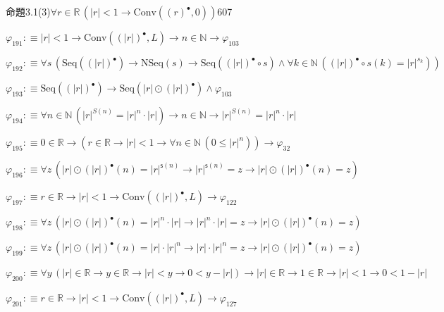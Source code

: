\begin{fullproof}{命題3.1(3)}{$\forall r \in \mathbb{R}\,(\lvert r \rvert < 1 \to \mathrm{Conv}({(r)^{\bullet}},0))$}{607}
\begin{abbrevlist}
\item $\varphi_{191} :\equiv \lvert r \rvert < 1 \to \mathrm{Conv}({(\lvert r \rvert)^{\bullet}},L) \to n \in \mathbb{N} \to \varphi_{103}$
\item $\varphi_{192} :\equiv \forall s\,(\mathrm{Seq}({(\lvert r \rvert)^{\bullet}}) \to \mathrm{NSeq}(s) \to \mathrm{Seq}({(\lvert r \rvert)^{\bullet}} \circ s) \land \forall k \in \mathbb{N}\,({(\lvert r \rvert)^{\bullet}} \circ s(k) = {{\lvert r \rvert}^{s_{k}}}))$
\item $\varphi_{193} :\equiv \mathrm{Seq}({(\lvert r \rvert)^{\bullet}}) \to \mathrm{Seq}(\lvert r \rvert \odot {(\lvert r \rvert)^{\bullet}}) \land \varphi_{103}$
\item $\varphi_{194} :\equiv \forall n \in \mathbb{N}\,({{\lvert r \rvert}^{S(n)}} = {{\lvert r \rvert}^{n}} \cdot \lvert r \rvert) \to n \in \mathbb{N} \to {{\lvert r \rvert}^{S(n)}} = {{\lvert r \rvert}^{n}} \cdot \lvert r \rvert$
\item $\varphi_{195} :\equiv 0 \in \mathbb{R} \to (r \in \mathbb{R} \to \lvert r \rvert < 1 \to \forall n \in \mathbb{N}\,(0 \leq {{\lvert r \rvert}^{n}})) \to \varphi_{32}$
\item $\varphi_{196} :\equiv \forall z\,(\lvert r \rvert \odot {(\lvert r \rvert)^{\bullet}}(n) = {{\lvert r \rvert}^{\mathsf{s}(n)}} \to {{\lvert r \rvert}^{\mathsf{s}(n)}} = z \to \lvert r \rvert \odot {(\lvert r \rvert)^{\bullet}}(n) = z)$
\item $\varphi_{197} :\equiv r \in \mathbb{R} \to \lvert r \rvert < 1 \to \mathrm{Conv}({(\lvert r \rvert)^{\bullet}},L) \to \varphi_{122}$
\item $\varphi_{198} :\equiv \forall z\,(\lvert r \rvert \odot {(\lvert r \rvert)^{\bullet}}(n) = {{\lvert r \rvert}^{n}} \cdot \lvert r \rvert \to {{\lvert r \rvert}^{n}} \cdot \lvert r \rvert = z \to \lvert r \rvert \odot {(\lvert r \rvert)^{\bullet}}(n) = z)$
\item $\varphi_{199} :\equiv \forall z\,(\lvert r \rvert \odot {(\lvert r \rvert)^{\bullet}}(n) = \lvert r \rvert \cdot {{\lvert r \rvert}^{n}} \to \lvert r \rvert \cdot {{\lvert r \rvert}^{n}} = z \to \lvert r \rvert \odot {(\lvert r \rvert)^{\bullet}}(n) = z)$
\item $\varphi_{200} :\equiv \forall y\,(\lvert r \rvert \in \mathbb{R} \to y \in \mathbb{R} \to \lvert r \rvert < y \to 0 < y - \lvert r \rvert) \to \lvert r \rvert \in \mathbb{R} \to 1 \in \mathbb{R} \to \lvert r \rvert < 1 \to 0 < 1 - \lvert r \rvert$
\item $\varphi_{201} :\equiv r \in \mathbb{R} \to \lvert r \rvert < 1 \to \mathrm{Conv}({(\lvert r \rvert)^{\bullet}},L) \to \varphi_{127}$

\end{abbrevlist}
\end{fullproof}
